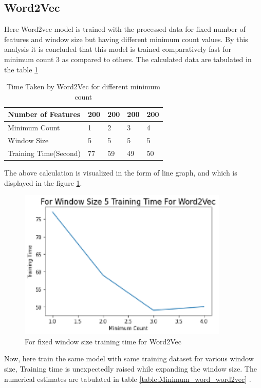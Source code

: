 \subsection{Word2Vec}
Here Word2vec model is trained with the processed data for fixed number of features and window size but having different minimum count values. By this analysis it is concluded that this model is trained comparatively fast for minimum count 3 as compared to others. The calculated data are tabulated in the table \ref{table:Word2Vec_minimum_count}
\begin{center}
\begin{table}[H]
\caption{Time Taken by Word2Vec for different minimum count}
\label{table:Word2Vec_minimum_count}
\centering
\begin{tabular}{ |p{4cm}|p{2cm}|p{2cm}|p{2cm}|p{2cm}|  }
 \hline
 Number of Features & 200 &200 &200 &200  \\
 \hline
 Minimum Count   & 1 &2 &3 &4    \\
 \hline
 Window Size &5 &5 &5 &5 \\
 \hline
 Training Time(Second) &77 &59 &49 &50 \\
 \hline
\end{tabular}
\end{table}
\end{center}
The above calculation is visualized in the form of line graph, and which is displayed in the figure \ref{fig:fixed_window_word2vec}.
\begin{figure}[H]
	\centering 
	\vspace{20pt}\includegraphics[width=10cm]{images/Word2Vec_fixed_window_line.png}
	\caption{For fixed window size training time for Word2Vec} 
	\label{fig:fixed_window_word2vec}
\end{figure}
Now, here train the same model with same training dataset for various window size, Training time is unexpectedly raised while expanding the window size. The numerical estimates are tabulated in table \ref{table:Minimum_word_word2vec} .
